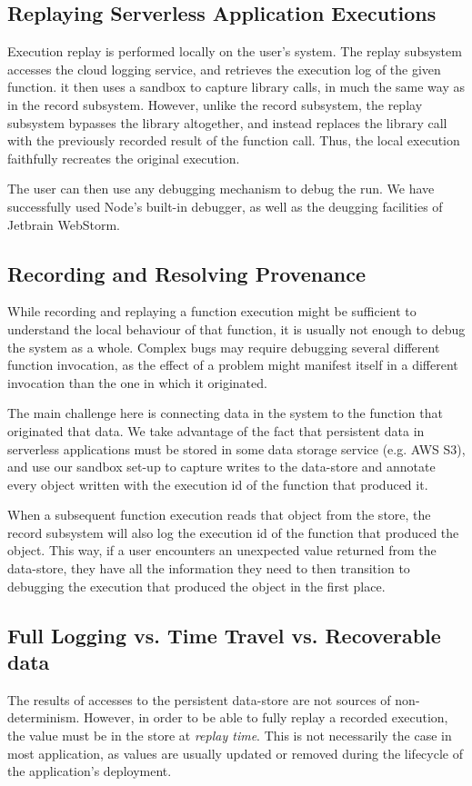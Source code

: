 \subsection{Replaying Serverless Application Executions}
Execution replay is performed locally on the user's system. The replay
subsystem accesses the cloud logging service, and retrieves the execution log
of the given function. it then uses a sandbox to capture library calls, in much
the same way as in the record subsystem. However, unlike the record subsystem,
the replay subsystem bypasses the library altogether, and instead replaces the
library call with the previously recorded result of the function call. Thus, the
local execution faithfully recreates the original execution.

The user can then use any debugging mechanism to debug the run. We have
successfully used Node's built-in debugger, as well as the deugging facilities
of Jetbrain WebStorm.

\subsection{Recording and Resolving Provenance}
While recording and replaying a function execution might be sufficient to
understand the local behaviour of that function, it is usually not enough to
debug the system as a whole. Complex bugs may require debugging several
different function invocation, as the effect of a problem might manifest itself
in a different invocation than the one in which it originated.

The main challenge here is connecting data in the system to the function that
originated that data. We take advantage of the fact that persistent data in
serverless applications must be stored in some data storage service (e.g. AWS
S3), and use our sandbox set-up to capture writes to the data-store and annotate
every object written with the execution id of the function that produced it.

When a subsequent function execution reads that object from the store, the
record subsystem will also log the execution id of the function that produced
the object. This way, if a user encounters an unexpected value returned from the
data-store, they have all the information they need to then transition to
debugging the execution that produced the object in the first place.

\subsection{Full Logging vs. Time Travel vs. Recoverable data}
The results of accesses to the persistent data-store are not sources of
non-determinism. However, in order to be able to fully replay a recorded
execution, the value must be in the store at \emph{replay time}. This is not
necessarily the case in most application, as values are usually updated or
removed during the lifecycle of the application's deployment.

